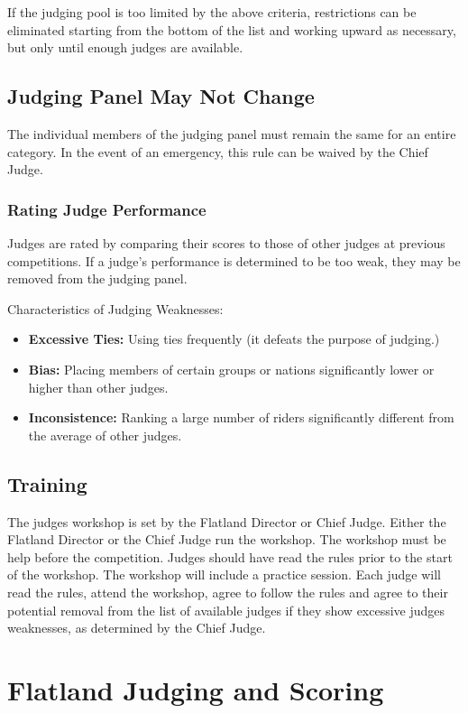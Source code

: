 If the judging pool is too limited by the above criteria, restrictions can be eliminated starting from the bottom of the list and working upward as necessary, but only until enough judges are available.

\subsection{Judging Panel May Not Change}

The individual members of the judging panel must remain the same for an entire category.
In the event of an emergency, this rule can be waived by the Chief Judge.

\subsubsection{Rating Judge Performance}
Judges are rated by comparing their scores to those of other judges at previous competitions.
If a judge's performance is determined to be too weak, they may be removed from the judging panel.

Characteristics of Judging Weaknesses:
\begin{itemize}
\item \textbf{Excessive Ties:}
Using ties frequently (it defeats the purpose of judging.)
\item \textbf{Bias:}
Placing members of certain groups or nations significantly lower or higher than other judges.
\item\textbf{Inconsistence:}
Ranking a large number of riders significantly different from the average of other judges.
\end{itemize}

\subsection{Training}
The judges workshop is set by the Flatland Director or Chief Judge.
Either the Flatland Director or the Chief Judge run the workshop.
The workshop must be help before the competition.
Judges should have read the rules prior to the start of the workshop.
The workshop will include a practice session.
Each judge will read the rules, attend the workshop, agree to follow the rules and agree to their potential removal from the list of available judges if they show excessive judges weaknesses, as determined by the Chief Judge.

\section{Flatland Judging and Scoring}

